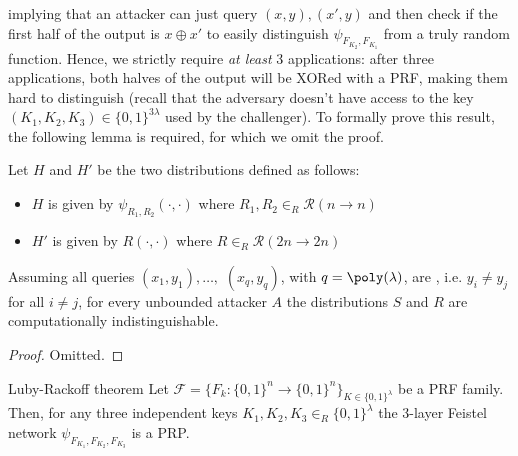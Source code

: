 \documentclass[a4paper, 12pt]{report}
\begin{document}
    implying that an attacker can just query $(x,y), (x',y)$ and then check if the first half of the output is $x \oplus x'$ to easily distinguish $\psi_{F_{K_2}, F_{K_1}}$ from a truly random function. Hence, we strictly require \textit{at least} 3 applications: after three applications, both halves of the output will be XORed with a PRF, making them hard to distinguish (recall that the adversary doesn't have access to the key $(K_1, K_2, K_3) \in \{0,1\}^{3\lambda}$ used by the challenger). To formally prove this result, the following lemma is required, for which we omit the proof.

    \begin{framedlem}{}
        Let $H$ and $H'$ be the two distributions defined as follows:
        \begin{itemize}
            \item $H$ is given by $\psi_{R_1, R_2}(\cdot, \cdot)$ where $R_1,R_2 \in_R \mathcal{R}(n \to n)$ 
            \item $H'$ is given by $R(\cdot, \cdot)$ where $R \in_R \mathcal{R}(2n \to 2n)$ 
        \end{itemize}

        Assuming all queries $(x_1, y_1), \ldots,$ $(x_q, y_q)$, with $q = \poly(\lambda)$, are , i.e. $y_i \neq y_j$ for all $i \neq j$, for every unbounded attacker $A$ the distributions $S$ and $R$ are computationally indistinguishable.
    \end{framedlem}

    \begin{proof}
        Omitted.
    \end{proof}

    \begin{framedthm}{Luby-Rackoff theorem}
        Let $\mathcal{F} = \{F_k : \{0,1\}^n \to \{0,1\}^n\}_{K \in \{0,1\}^\lambda}$ be a PRF family. Then, for any three independent keys $K_1, K_2, K_3 \in_R \{0,1\}^\lambda$ the 3-layer Feistel network $\psi_{F_{K_1}, F_{K_2}, F_{K_3}}$ is a PRP.
    \end{framedthm}
\end{document}
